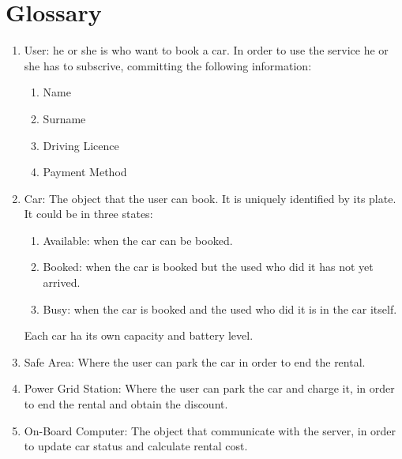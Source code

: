 \section{Glossary}
\begin{enumerate}
	\item User: he or she is who want to book a car. In order to use the service he or she has to subscrive, committing the following information:
	\begin{enumerate}
	\item Name
	\item Surname
	\item Driving Licence
	\item Payment Method
	\end{enumerate}
	\item Car: The object that the user can book. It is uniquely identified by its plate. It could be in three states:
	\begin{enumerate}
	\item Available: when the car can be booked.
	\item Booked: when the car is booked but the used who did it has not yet arrived.
	\item Busy: when the car is booked and the used who did it is in the car itself.
	\end{enumerate}
	Each car ha its own capacity and battery level.
	\item Safe Area: Where the user can park the car in order to end the rental.
	\item Power Grid Station: Where the user can park the car and charge it, in order to end the rental and obtain the discount.
	\item On-Board Computer: The object that communicate with the server, in order to update car status and calculate rental cost.
	
	
\end{enumerate}